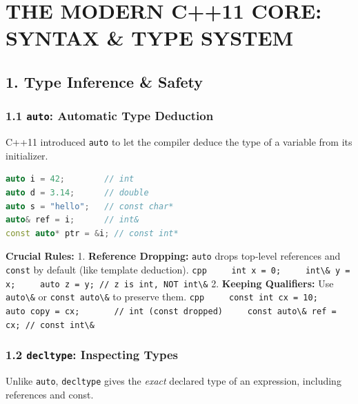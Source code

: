 \hypertarget{the-modern-c11-core-syntax-type-system}{%
\chapter{THE MODERN C++11 CORE: SYNTAX \& TYPE
SYSTEM}\label{the-modern-c11-core-syntax-type-system}}

\hypertarget{type-inference-safety}{%
\section{1. Type Inference \& Safety}\label{type-inference-safety}}

\hypertarget{auto-automatic-type-deduction}{%
\subsection{\texorpdfstring{1.1 \texttt{auto}: Automatic Type
Deduction}{1.1 auto: Automatic Type Deduction}}\label{auto-automatic-type-deduction}}

C++11 introduced \passthrough{\lstinline!auto!} to let the compiler
deduce the type of a variable from its initializer.

\begin{lstlisting}[language={C++}]
auto i = 42;        // int
auto d = 3.14;      // double
auto s = "hello";   // const char*
auto& ref = i;      // int&
const auto* ptr = &i; // const int*
\end{lstlisting}

\textbf{Crucial Rules:} 1. \textbf{Reference Dropping:}
\passthrough{\lstinline!auto!} drops top-level references and
\passthrough{\lstinline!const!} by default (like template deduction).
\passthrough{\lstinline!cpp     int x = 0;     int\& y = x;     auto z = y; // z is int, NOT int\&!}
2. \textbf{Keeping Qualifiers:} Use \passthrough{\lstinline!auto\&!} or
\passthrough{\lstinline!const auto\&!} to preserve them.
\passthrough{\lstinline!cpp     const int cx = 10;     auto copy = cx;       // int (const dropped)     const auto\& ref = cx; // const int\&!}

\hypertarget{decltype-inspecting-types}{%
\subsection{\texorpdfstring{1.2 \texttt{decltype}: Inspecting
Types}{1.2 decltype: Inspecting Types}}\label{decltype-inspecting-types}}

Unlike \passthrough{\lstinline!auto!},
\passthrough{\lstinline!decltype!} gives the \emph{exact} declared type
of an expression, including references and const.

